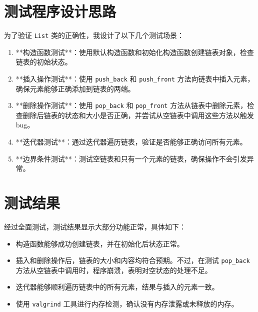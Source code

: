\documentclass[UTF8]{ctexart}
\begin{document}
\pagestyle{fancy}
\fancyhead{}

\section{测试程序设计思路}

为了验证 \texttt{List} 类的正确性，我设计了以下几个测试场景：

\begin{enumerate}[label=\arabic*.]
    \item **构造函数测试**：使用默认构造函数和初始化构造函数创建链表对象，检查链表的初始状态。
    \item **插入操作测试**：使用 \texttt{push\_back} 和 \texttt{push\_front} 方法向链表中插入元素，确保元素能够正确添加到链表的两端。
    \item **删除操作测试**：使用 \texttt{pop\_back} 和 \texttt{pop\_front} 方法从链表中删除元素，检查删除后链表的状态和大小是否正确，并尝试从空链表中调用这些方法以触发 bug。
    \item **迭代器测试**：通过迭代器遍历链表，验证是否能够正确访问所有元素。
    \item **边界条件测试**：测试空链表和只有一个元素的链表，确保操作不会引发异常。
\end{enumerate}

\section{测试结果}

经过全面测试，测试结果显示大部分功能正常，具体如下：

\begin{itemize}
    \item 构造函数能够成功创建链表，并在初始化后状态正常。
    \item 插入和删除操作后，链表的大小和内容均符合预期。不过，在测试 \texttt{pop\_back} 方法从空链表中调用时，程序崩溃，表明对空状态的处理不足。
    \item 迭代器能够顺利遍历链表中的所有元素，结果与插入的元素一致。
    \item 使用 \texttt{valgrind} 工具进行内存检测，确认没有内存泄露或未释放的内存。
\end{itemize}
\end{document}
